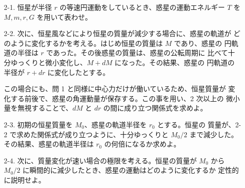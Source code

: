 \documentclass[report]{dennou777}
\begin{document}
\begin{itemize}
	\item[2-1.] 恒星が半径 $r$ の等速円運動をしているとき、惑星の運動エネルギー
		$T$ を $M,m,r,G$ を用いて表わせ。
	\item[2-2.] 次に、恒星風などにより恒星の質量が減少する場合に、惑星の軌道が
		どのように変化するかを考える。はじめ恒星の質量は $M$ であり、惑星の
		円軌道の半径は $r$ であった。その後惑星の質量は、惑星の公転周期に
		比べて十分ゆっくりと微小変化し、$M+dM$ になった。その結果、惑星の
		円軌道の半径が $r+dr$ に変化したとする。

		この場合にも、問 1 と同様に中心力だけが働いているため、恒星質量が
		変化する前後で、惑星の角運動量が保存する。この事を用い、2 次以上の
		微小量を無視することで、$dM$ と $dr$ の間に成り立つ関係式を求めよ。
	\item[2-3.] 初期の恒星質量を $M_0$、惑星の軌道半径を $r_0$ とする。恒星の
		質量が、2-2 で求めた関係式が成り立つように、十分ゆっくりと $M_0/2$
		まで減少した。その結果、惑星の軌道半径は $r_0$ の何倍になるか求めよ。
	\item[2-4.] 次に、質量変化が速い場合の極限を考える。恒星の質量が $M_0$ から
		$M_0/2$ に瞬間的に減少したとき、惑星の運動はどのように変化するか
		定性的に説明せよ。
\end{itemize}
\end{document}
